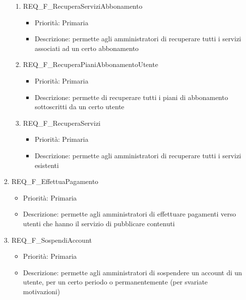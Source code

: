 \begin{enumerate}
\begin{enumerate}[label*=\arabic*.]
		\item REQ\_F\_RecuperaServiziAbbonamento
			\begin{itemize}	
			\item Priorità: Primaria
			\item Descrizione: permette agli amministratori di recuperare tutti i servizi associati ad un certo abbonamento
			\end{itemize}
	
		\item REQ\_F\_RecuperaPianiAbbonamentoUtente
			\begin{itemize}	
			\item Priorità: Primaria
			\item Descrizione: permette di recuperare tutti i piani di abbonamento sottoscritti da un certo utente
			\end{itemize}

		\item REQ\_F\_RecuperaServizi
			\begin{itemize}	
			\item Priorità: Primaria
			\item Descrizione: permette agli amministratori di recuperare tutti i servizi esistenti
			\end{itemize}
		\end{enumerate}

	\item REQ\_F\_EffettuaPagamento
		\begin{itemize}	
		\item Priorità: Primaria
		\item Descrizione: permette agli amministratori di effettuare pagamenti verso utenti che hanno il servizio di pubblicare contenuti
		\end{itemize}
	\item REQ\_F\_SospendiAccount
		\begin{itemize}	
		\item Priorità: Primaria
		\item Descrizione: permette agli amministratori di sospendere un account di un utente, per un certo periodo o permanentemente  (per svariate motivazioni)	
		\end{itemize}

	

\end{enumerate}
